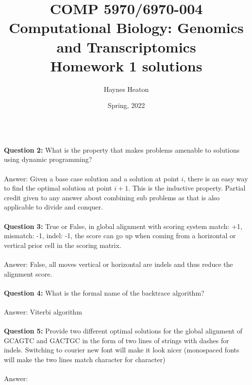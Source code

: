\documentclass{article}\usepackage[]{graphicx}\usepackage[]{color}
\newcommand{\blankline}{\quad\pagebreak[2]}
\begin{document}
\title{COMP 5970/6970-004 \\ Computational Biology: Genomics and Transcriptomics \\ Homework 1 solutions }
\author{Haynes Heaton}
\date{Spring, 2022}


\maketitle
\blankline

\begin{tabular*}{.93\textwidth}{@{\extracolsep{\fill}}lr}



\hline
\end{tabular*}


\textbf{Question 2:} What is the property that makes problems amenable to solutions using dynamic programming? \\ \\
Answer: Given a base case solution and a solution at point $i$, there is an easy way to find the optimal solution at point $i+1$. This is the inductive property. Partial credit given to any answer about combining sub problems as that is also applicable to divide and conquer. \\ \\

\textbf{Question 3:} True or False, in global alignment with scoring system match: +1, mismatch: -1, indel: -1, the score can go up when coming from a horizontal or vertical prior cell in the scoring matrix. \\ \\
Answer: False, all moves vertical or horizontal are indels and thus reduce the alignment score. \\ \\

\textbf{Question 4:} What is the formal name of the backtrace algorithm? \\ \\
Answer: Viterbi algorithm \\ \\

\textbf{Question 5:} Provide two different optimal solutions for the global alignment of GCAGTC and GACTGC in the form of two lines of strings with dashes for indels. Switching to courier new font will make it look nicer (monospaced fonts will make the two lines match character for character) \\ \\
Answer: \\ 
\end{document}
